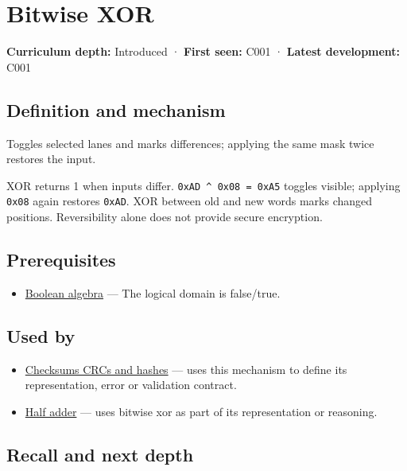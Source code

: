 \hypertarget{appendix-d49161831368}{}
\section{Bitwise XOR}\label{appendix-d49161831368-bitwise-xor}

\textbf{Curriculum depth:} Introduced · \textbf{First seen:} C001 · \textbf{Latest development:} C001

\subsection{Definition and mechanism}\label{appendix-d49161831368-definition-and-mechanism}

Toggles selected lanes and marks differences; applying the same mask twice restores the input.

XOR returns 1 when inputs differ. \texttt{0xAD\ \^{}\ 0x08\ =\ 0xA5} toggles visible; applying \texttt{0x08} again restores \texttt{0xAD}. XOR between old and new words marks changed positions. Reversibility alone does not provide secure encryption.

\subsection{Prerequisites}\label{appendix-d49161831368-prerequisites}

\begin{itemize}
\tightlist
\item
  \hyperref[appendix-24475e1596a8]{Boolean algebra} --- The logical domain is false/true.
\end{itemize}

\subsection{Used by}\label{appendix-d49161831368-used-by}

\begin{itemize}
\item
  \hyperref[appendix-ed338677de0a]{Checksums CRCs and hashes} --- uses this mechanism to define its representation, error or validation contract.
\item
  \hyperref[appendix-1652d27a8e90]{Half adder} --- uses bitwise xor as part of its representation or reasoning.
\end{itemize}

\subsection{Recall and next depth}\label{appendix-d49161831368-recall-and-next-depth}

